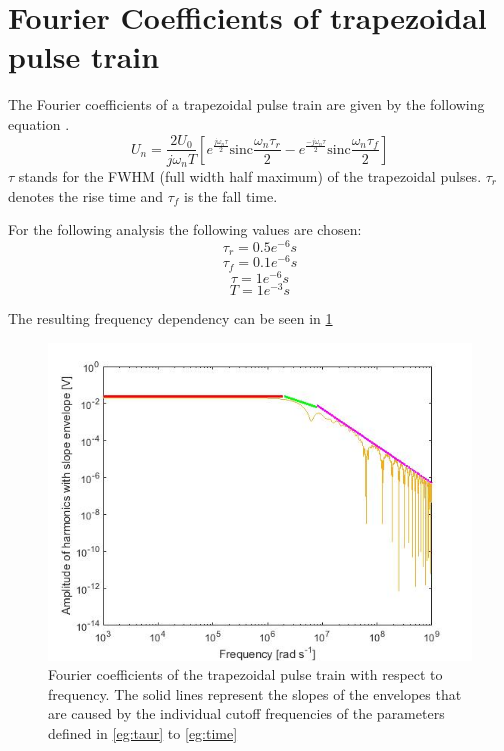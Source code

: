 \section{Fourier Coefficients of trapezoidal pulse  train }

The Fourier coefficients of a trapezoidal pulse train are given by the following equation \cite{FaerberMVISS}. 
\begin{equation}
 U_n = \frac{2 U_0}{j \omega_n T} [e^{\frac{j \omega_n \tau}{2}} \textrm{sinc}{\frac { \omega_n \tau_r }{2}} -e^{\frac{-j \omega_n \tau}{2}} \textrm{sinc}{\frac{ \omega_n \tau_f}{2}}]
\end{equation}
$\tau$ stands for the FWHM (full width half maximum) of the trapezoidal pulses.
$\tau_r$ denotes the rise time  and $\tau_f$ is the fall time.

For the following analysis the following values are chosen:
\begin{equation}
\label{eg:taur}
 \tau_r = 0.5e^{-6 } s
  \end{equation}
  \begin{equation}
 \tau_f = 0.1e^{-6} s
  \end{equation}
 \begin{equation}
\tau= 1e^{-6} s
 \end{equation}
 \begin{equation}
 \label{eg:time}
  T=1e^{-3} s
 \end{equation}
 \newpage

The resulting frequency dependency can be seen in  \ref{fig.envelope}

\begin{figure}[H]
\includegraphics[width=\textwidth]{figures/Method/signal_simulation/envelope.jpg}
\caption[Kurze Abbildungsbeschreibung]{Fourier coefficients of the trapezoidal pulse train with respect to frequency. The solid lines represent the slopes of the envelopes that are caused by the individual 
cutoff frequencies of the parameters defined in \eqref{eg:taur} to \eqref{eg:time}}
\label{fig.envelope}
\end{figure}

